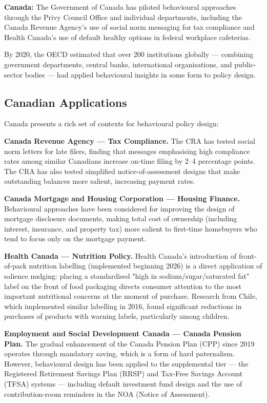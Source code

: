 \documentclass[12pt, letterpaper]{article}
\begin{document}
\textbf{Canada:} The Government of Canada has piloted behavioural approaches through the Privy Council Office and individual departments, including the Canada Revenue Agency's use of social norm messaging for tax compliance and Health Canada's use of default healthy options in federal workplace cafeterias.

By 2020, the OECD estimated that over 200 institutions globally --- combining government departments, central banks, international organisations, and public-sector bodies --- had applied behavioural insights in some form to policy design.


\subsection{Canadian Applications}


Canada presents a rich set of contexts for behavioural policy design:

\textbf{Canada Revenue Agency --- Tax Compliance.} The CRA has tested social norm letters for late filers, finding that messages emphasising high compliance rates among similar Canadians increase on-time filing by 2--4 percentage points. The CRA has also tested simplified notice-of-assessment designs that make outstanding balances more salient, increasing payment rates.

\textbf{Canada Mortgage and Housing Corporation --- Housing Finance.} Behavioural approaches have been considered for improving the design of mortgage disclosure documents, making total cost of ownership (including interest, insurance, and property tax) more salient to first-time homebuyers who tend to focus only on the mortgage payment.

\textbf{Health Canada --- Nutrition Policy.} Health Canada's introduction of front-of-pack nutrition labelling (implemented beginning 2026) is a direct application of salience nudging: placing a standardised "high in sodium/sugar/saturated fat" label on the front of food packaging directs consumer attention to the most important nutritional concerns at the moment of purchase. Research from Chile, which implemented similar labelling in 2016, found significant reductions in purchases of products with warning labels, particularly among children.

\textbf{Employment and Social Development Canada --- Canada Pension Plan.} The gradual enhancement of the Canada Pension Plan (CPP) since 2019 operates through mandatory saving, which is a form of hard paternalism. However, behavioural design has been applied to the supplemental tier --- the Registered Retirement Savings Plan (RRSP) and Tax-Free Savings Account (TFSA) systems --- including default investment fund design and the use of contribution-room reminders in the NOA (Notice of Assessment).
\end{document}
